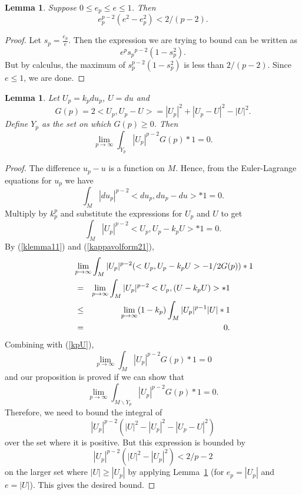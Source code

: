 \documentclass{ip-journal}
\newtheorem{lemma}[theorem]{Lemma}
\theoremstyle{definition}
\numberwithin{equation}{section}
\begin{document}
\begin{lemma}  \label{klemma2}  Suppose $0 \leq e_p \leq e \leq 1$. Then 
\[
 e_p^{p-2}(e^2 - e_p^2) < 2/(p-2).
 \]
\end{lemma}

\begin{proof}  Let  $s_p = \frac{e_p}{e}$.    Then the expression we are trying to bound can be written as
\[
 e^p {s_p}^{p-2}(1 - s_p^2).
 \]
   But by calculus, the maximum of $s_p^{p-2}(1-s_p^2)$ is less than $2/(p-2)$. Since $e \leq 1$, we are done.
\end{proof}

\begin{lemma}  \label{kprop 3} Let  $U_p=k_pdu_p$, $U=du$ and
\[ 
G(p) =  2<U_p ,U_p -U> =|U_p|^2+ |U_p -U|^2 - |U|^2.
\]
  Define $Y_p$ as the set on which $G(p) \geq 0$.    Then
 \[   
 \lim_{p\rightarrow \infty}  \int_{Y_p}  |U_p|^{p-2}G(p)*1 = 0.
 \]
\end{lemma}
\begin{proof}   The difference $u_p - u$ is a function on $M$.  Hence, from the Euler-Lagrange equations for $u_p$ we have
\[
 \int_M  |du_p|^{p-2}<du_p,du_p - du>*1 = 0.
\]
Multiply by $k_p^p$ and substitute the expressions for $U_p$ and $U$ to get
\begin{equation}\label{kpU}
\int_M |U_p|^{p-2}<U_p, U_p - k_pU>*1 = 0.
\end{equation}
By (\ref{klemma11}) and (\ref{kappavolform21}),
\begin{eqnarray*}
\lefteqn{ \lim_{p\rightarrow \infty}  \int_M |U_p|^{p-2}(<U_p, U_p - k_pU>-1/2G(p))*1} \nonumber\\
&=&  \lim_{p\rightarrow \infty}  \int_M |U_p|^{p-2}<U_p, (U - k_pU)>*1 \nonumber\\
&\leq& \lim_{p\rightarrow \infty} (1-k_p) \int_M |U_p|^{p-1}|U|*1\\
&=& 0 \nonumber.
\end{eqnarray*}  
Combining with (\ref{kpU}),
\begin{equation}\label{kpU234}
 \lim_{p\rightarrow \infty} \int_M |U_p|^{p-2}G(p)*1 = 0
\end{equation}
and our proposition is proved if we can show that
\[
\lim_{p\rightarrow \infty} \int_{M \backslash Y_p} |U_p|^{p-2}G(p)*1 = 0.
\] 
Therefore, we need to bound the integral of
\[
 |U_p|^{p-2}(|U|^2 - |U_p|^2 - |U_p - U|^2)
 \]
  over the set where it is positive.
But this expression is bounded by 
 \[
 |U_p|^{p-2}(|U|^2 - |U_p|^2) < 2/p-2
 \]
on the larger set where $|U| \geq |U_p|$ by applying Lemma~\ref{klemma2} (for $e_p=|U_p|$ and $e=|U|$). This gives the desired bound.
\end{proof}
\end{document}
